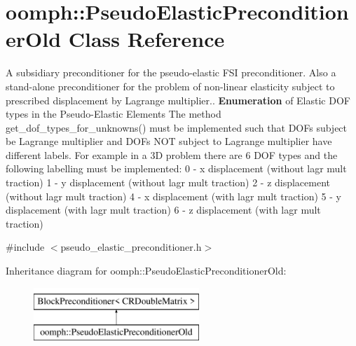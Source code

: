 \hypertarget{classoomph_1_1PseudoElasticPreconditionerOld}{}\section{oomph\+:\+:Pseudo\+Elastic\+Preconditioner\+Old Class Reference}
\label{classoomph_1_1PseudoElasticPreconditionerOld}


A subsidiary preconditioner for the pseudo-\/elastic F\+SI preconditioner. Also a stand-\/alone preconditioner for the problem of non-\/linear elasticity subject to prescribed displacement by Lagrange multiplier.. {\bfseries Enumeration} of Elastic D\+OF types in the Pseudo-\/\+Elastic Elements The method get\+\_\+dof\+\_\+types\+\_\+for\+\_\+unknowns() must be implemented such that D\+O\+Fs subject be Lagrange multiplier and D\+O\+Fs N\+OT subject to Lagrange multiplier have different labels. For example in a 3D problem there are 6 D\+OF types and the following labelling must be implemented\+: 0 -\/ x displacement (without lagr mult traction) 1 -\/ y displacement (without lagr mult traction) 2 -\/ z displacement (without lagr mult traction) 4 -\/ x displacement (with lagr mult traction) 5 -\/ y displacement (with lagr mult traction) 6 -\/ z displacement (with lagr mult traction)  




{\ttfamily \#include $<$pseudo\+\_\+elastic\+\_\+preconditioner.\+h$>$}

Inheritance diagram for oomph\+:\+:Pseudo\+Elastic\+Preconditioner\+Old\+:\begin{figure}[H]
\begin{center}
\leavevmode
\includegraphics[height=2.000000cm]{classoomph_1_1PseudoElasticPreconditionerOld}
\end{center}
\end{figure}
